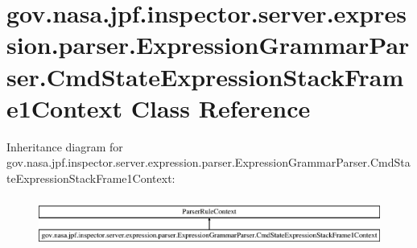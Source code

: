 \hypertarget{classgov_1_1nasa_1_1jpf_1_1inspector_1_1server_1_1expression_1_1parser_1_1_expression_grammar_pabec1adacda521b9e6ed9ea64caf537b4}{}\section{gov.\+nasa.\+jpf.\+inspector.\+server.\+expression.\+parser.\+Expression\+Grammar\+Parser.\+Cmd\+State\+Expression\+Stack\+Frame1\+Context Class Reference}
\label{classgov_1_1nasa_1_1jpf_1_1inspector_1_1server_1_1expression_1_1parser_1_1_expression_grammar_pabec1adacda521b9e6ed9ea64caf537b4}
Inheritance diagram for gov.\+nasa.\+jpf.\+inspector.\+server.\+expression.\+parser.\+Expression\+Grammar\+Parser.\+Cmd\+State\+Expression\+Stack\+Frame1\+Context\+:\begin{figure}[H]
\begin{center}
\leavevmode
\includegraphics[height=1.639824cm]{classgov_1_1nasa_1_1jpf_1_1inspector_1_1server_1_1expression_1_1parser_1_1_expression_grammar_pabec1adacda521b9e6ed9ea64caf537b4}
\end{center}
\end{figure}
